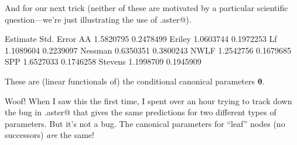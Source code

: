\documentclass[11pt]{article}
\newcommand{\boldtheta}{{\boldsymbol{\theta}}}
\begin{document}
And for our next trick (neither of these are motivated by a particular
scientific question---we're just illustrating the use of \verb@predict.aster@).
\begin{Schunk}
\begin{Soutput}
         Estimate Std. Error
AA      1.5820795  0.2478499
Eriley  1.0603744  0.1972253
Lf      1.1089604  0.2239097
Nessman 0.6350351  0.3800243
NWLF    1.2542756  0.1679685
SPP     1.6527033  0.1746258
Stevens 1.1998709  0.1945909
\end{Soutput}
\end{Schunk}
These are
(linear functionals of) the conditional canonical parameters $\boldtheta$.

Woof!  When I saw this the first time, I spent over an hour trying to track
down the bug in \verb@predict.aster@ that gives the same predictions for
two different types of parameters.  But it's not a bug. The canonical
parameters for ``leaf'' nodes (no successors) \emph{are} the same!
\end{document}
